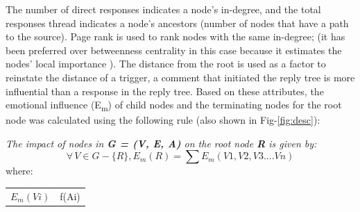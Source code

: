 \documentclass[acmtog]{acmart}
\makeatletter
\newenvironment{conditions}
  {\par\vspace{\abovedisplayskip}\noindent\begin{tabular}{>{$}l<{$} @{${}={}$} l}}
  {\end{tabular}\par\vspace{\belowdisplayskip}}
\makeatother
\begin{document}
The number of direct responses indicates a node's in-degree, and the total responses thread indicates a node's ancestors (number of nodes that have a path to the source). Page rank is used to rank nodes with the same in-degree; (it has been preferred over betweenness centrality in this case because it estimates the nodes' local importance \cite{antonakaki2021survey}). The distance from the root is used as a factor to reinstate the distance of a trigger, a comment that initiated the reply tree is more influential than a response in the reply tree. Based on these attributes, the emotional influence (E\textsubscript{m}) of child nodes and the terminating nodes for the root node was calculated using the following rule (also shown in Fig-\ref{fig:desc}): 




\textit{The impact of nodes in \textbf{G = (V, E, A)} on the root node \textbf{R} is given by:}
\begin{equation}
\forall \,V \in G-\{R\},
E_{m}(R) = \sum{E_{m}(V1, V2, V3....Vn)}
\end{equation}
where:
\begin{conditions}
E_{m}(Vi) & f(Ai)
\end{conditions}



\end{document}
